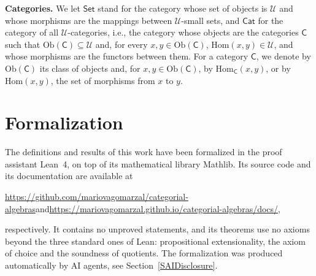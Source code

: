 \documentclass[a4paper, reqno]{amsbook}
\theoremstyle{plain}
\theoremstyle{definition}
\begin{document}
\textbf{Categories.} We let $\mathsf{Set}$ stand for the category whose set of objects is $\boldsymbol{\mathcal{U}}$ and whose morphisms are the mappings between $\boldsymbol{\mathcal{U}}$-small sets, and $\mathsf{Cat}$ for the category of all $\boldsymbol{\mathcal{U}}$-categories, i.e., the category whose objects are the categories $\mathsf{C}$ such that $\mathrm{Ob}(\mathsf{C})\subseteq\boldsymbol{\mathcal{U}}$ and, for every $x,y\in\mathrm{Ob}(\mathsf{C})$, $\mathrm{Hom}(x,y)\in\boldsymbol{\mathcal{U}}$, and whose morphisms are the functors between them.
For a category $\mathsf{C}$, we denote by $\mathrm{Ob}(\mathsf{C})$ its class of objects and, for $x,y\in\mathrm{Ob}(\mathsf{C})$, by $\mathrm{Hom}_{\mathsf{C}}(x,y)$, or by $\mathrm{Hom}(x,y)$, the set of morphisms from $x$ to $y$.

\section{Formalization}\label{SFormalization}

The definitions and results of this work have been formalized in the proof assistant Lean~4, on top of its mathematical library Mathlib.
Its source code and its documentation are available at
\begin{center}
\url{https://github.com/mariovagomarzal/categorial-algebras}\quad and\quad \url{https://mariovagomarzal.github.io/categorial-algebras/docs/},
\end{center}
respectively.
It contains no unproved statements, and its theorems use no axioms beyond the three standard ones of Lean: propositional extensionality, the axiom of choice and the soundness of quotients.
The formalization was produced automatically by AI agents, see Section~\ref{SAIDisclosure}.
\end{document}
